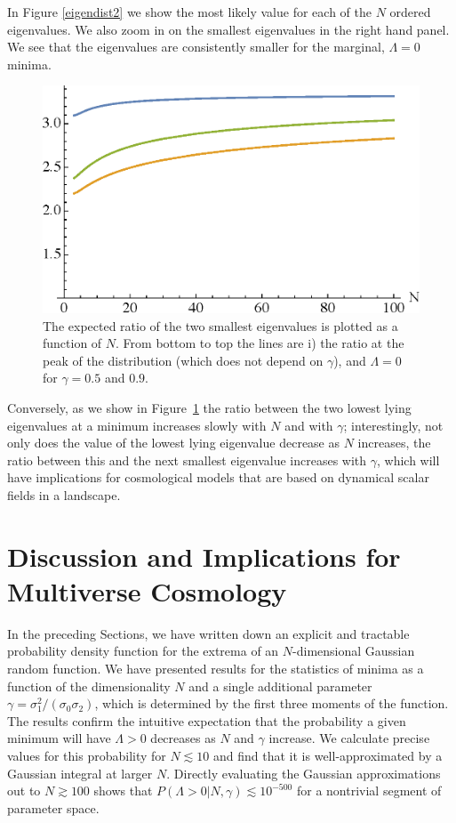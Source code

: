\documentclass[12pt]{article}
\begin{document}
In Figure \ref{eigendist2} we show the most likely value for each of the $N$ ordered eigenvalues. We also zoom in on the smallest eigenvalues in the right hand panel. We see that the eigenvalues are consistently smaller for the marginal, $\Lambda=0$ minima.

\begin{figure} 
  \centering
  \includegraphics[width=.6\linewidth]{ratio.eps}  
  \caption{The expected ratio of the two smallest eigenvalues is plotted as a function of $N$.   From bottom to top the lines are i) the ratio at the peak  of the distribution (which does not depend on $\gamma$), and $\Lambda=0$ for $\gamma =0.5$ and $0.9$.}
  \label{ratio}
\end{figure}

Conversely, as we show in Figure~\ref{ratio} the ratio between the two lowest lying eigenvalues at a minimum increases slowly with $N$ and with $\gamma$; interestingly, not only does the value of the lowest lying eigenvalue decrease as  $N$ increases, the ratio between this and the next smallest eigenvalue increases with $\gamma$, which will have implications for cosmological models that are based on dynamical scalar fields in a landscape. 





 
\section{Discussion and Implications for Multiverse Cosmology}

In the preceding Sections, we have  written down an explicit and tractable probability density function for the extrema of an $N$-dimensional  Gaussian random function. We have presented results for the statistics of minima as a function of the dimensionality $N$ and a single additional parameter $\gamma=\sigma_1^2/(\sigma_0\sigma_2)$, which is determined by the first three moments of the function. The results confirm the intuitive expectation that the probability a given minimum will have $\Lambda > 0$ decreases as $N$ and $\gamma$ increase. We calculate precise values for this probability for $N \lesssim10$ and find that it is well-approximated by a Gaussian integral at larger $N$. Directly evaluating the Gaussian approximations out to $N \gtrsim 100$ shows that $P(\Lambda > 0| N, \gamma) \lesssim 10^{-500}$ for a nontrivial segment of parameter space.
\end{document}
